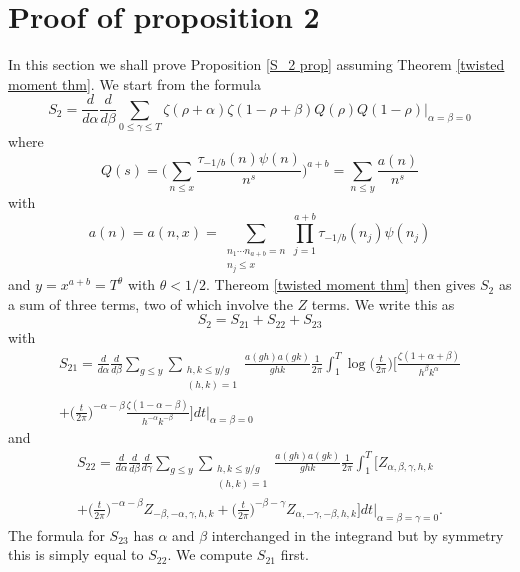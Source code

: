\documentclass[oneside, 12pt]{amsart}
\theoremstyle{definition}
\newcommand{\leqs}{\leqslant }
\begin{document}
\section{Proof of proposition 2 }\label{S2Proof}
In this section we shall prove Proposition \ref{S_2 prop} assuming Theorem \ref{twisted moment thm}. We start from the formula
\[
S_2=\frac{d}{d\alpha}\frac{d}{d\beta}\sum_{0\leqs \gamma \leqs T}\zeta(\rho+\alpha)\zeta(1-\rho+\beta)Q(\rho)Q(1-\rho) \big|_{\alpha=\beta=0}
\]
where 
\[
Q(s) =  \bigg(\sum_{n\leqs x}\frac{\tau_{-1/b}(n)\psi(n)}{n^s}\bigg)^{a+b}
        = \sum_{n\leqs y}\frac{a(n)}{n^s}
\]
with
\begin{equation}\label{coefficients}
a(n)=a(n,x) = \sum_{\substack{n_1\cdots n_{a+b}=n\\ n_j\leqs x}}\prod_{j=1}^{a+b} \tau_{-1/b}(n_j)\psi(n_j)
\end{equation}
and $y=x^{a+b}=T^\theta$ with $\theta<1/2$.
Thereom \ref{twisted moment thm} then gives $S_2$ as a sum of three terms, two of which involve the $Z$ terms. We write this as 
\[
S_2=S_{21}+S_{22}+S_{23}
\]
with
\begin{multline}
\label{S_21}
S_{21} = \frac{d}{d\alpha}\frac{d}{d\beta}  
              \sum_{g\leqs y}\sum_{\substack{h,k\leqs y/g\\(h,k)=1}}\frac{a(gh)a(gk)}{ghk}
              \frac{1}{2\pi}\int_1^T\log\bigg(\frac{t}{2\pi}\bigg)
    \bigg[
              \frac{\zeta(1+\alpha+\beta)}{h^{\beta}k^{\alpha}}
 \\     + \bigg(\frac{t}{2\pi}\bigg)^{-\alpha-\beta}
             \frac{\zeta(1-\alpha-\beta)}{h^{-\alpha}k^{-\beta}}
    \bigg]dt
\bigg|_{\alpha=\beta=0}
\end{multline}
and
\begin{multline}
\label{S_22}
S_{22} = \frac{d}{d\alpha}\frac{d}{d\beta}  \frac{d}{d\gamma}  
              \sum_{g\leqs y}\sum_{\substack{h,k\leqs y/g\\(h,k)=1}}\frac{a(gh)a(gk)}{ghk}
              \frac{1}{2\pi} \int_1^T\bigg[ 
               Z_{\alpha,\beta,\gamma,h,k}
\\       + \bigg(\frac{t}{2\pi}\bigg)^{-\alpha-\beta}Z_{-\beta,-\alpha,\gamma,h,k}
      + \bigg(\frac{t}{2\pi}\bigg)^{-\beta-\gamma}Z_{\alpha,-\gamma,-\beta,h,k}
     \bigg]dt
     \bigg|_{\alpha=\beta=\gamma=0}.
\end{multline}
The formula for $S_{23}$ has $\alpha$ and $\beta$ interchanged in the integrand but by symmetry this is simply equal to $S_{22}$. We compute $S_{21}$ first.
\end{document}
